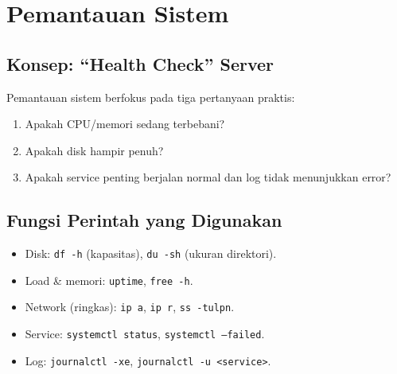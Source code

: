 \section{Pemantauan Sistem}
\label{sec:system-monitoring}

\subsection*{Konsep: ``Health Check'' Server}
Pemantauan sistem berfokus pada tiga pertanyaan praktis:
\begin{enumerate}
    \item Apakah CPU/memori sedang terbebani?
    \item Apakah disk hampir penuh?
    \item Apakah service penting berjalan normal dan log tidak menunjukkan error?
\end{enumerate}

\subsection*{Fungsi Perintah yang Digunakan}
\begin{itemize}
    \item Disk: \texttt{df -h} (kapasitas), \texttt{du -sh} (ukuran direktori).
    \item Load \& memori: \texttt{uptime}, \texttt{free -h}.
    \item Network (ringkas): \texttt{ip a}, \texttt{ip r}, \texttt{ss -tulpn}.
    \item Service: \texttt{systemctl status}, \texttt{systemctl --failed}.
    \item Log: \texttt{journalctl -xe}, \texttt{journalctl -u <service>}.
\end{itemize}


